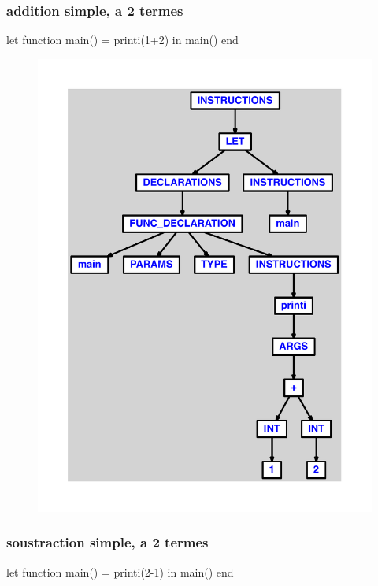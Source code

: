 \documentclass{article}
\begin{document}
\subsubsection{addition simple, a 2 termes}
\begin{verbatimtab}
let
	function main() = printi(1+2)
in main() end
\end{verbatimtab}
\begin{figure}[H]\centering\includegraphics[max width=\textwidth]{ast/ast_39.pdf}\end{figure}\subsubsection{soustraction simple, a 2 termes}
\begin{verbatimtab}
let
	function main() = printi(2-1)
in main() end
\end{verbatimtab}
\end{document}
